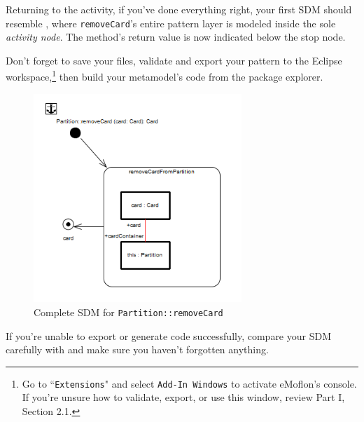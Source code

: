 \begin{stepbystep}
\vspace{0.5cm}

\item Returning to the activity, if you've done everything right, your first SDM should resemble
, where \texttt{removeCard}'s entire pattern layer is modeled inside the sole \emph{activity node}. The method's return
value is now indicated below the stop node.

\vspace{0.5cm}

\item  Don't forget to save your files, validate and export your pattern to the Eclipse workspace,\footnote{Go to
``\texttt{Extensions}" and select \texttt{Add-In Windows} to activate eMoflon's console. If you're unsure how to validate, export, or use this window, review
Part I, Section 2.1.} then build your metamodel's code from the package explorer.

\newpage

\begin{figure}[htbp]
\begin{center}
  \includegraphics[width=0.7\textwidth]{../../org.moflon.doc.handbook.03_storyDiagrams/03_removeCard/visRemImages/ea_sdmRemoveComplete}
  \caption{Complete SDM for \texttt{Partition::removeCard}}  
  \label{ea:sdm_complete_control_flow}
\end{center}
\end{figure}

\item If you're unable to export or generate code successfully, compare your SDM carefully with 
and make sure you haven't forgotten anything.

\vspace{0.5cm}

\end{stepbystep}


